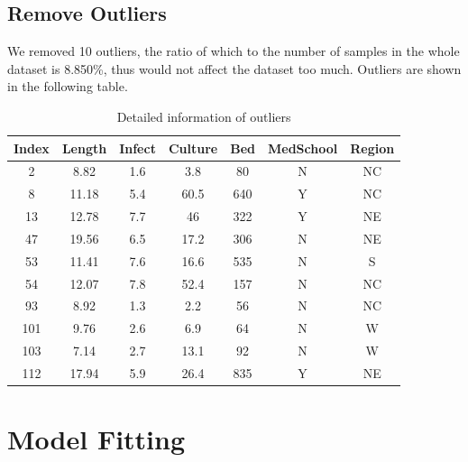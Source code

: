 \documentclass[a4paper,11pt,onecolumn,twoside]{article}
\begin{document}
\subsection{Remove Outliers}
We removed 10 outliers, the ratio of which to the number of samples in the whole dataset is 8.850\%, thus would not affect the dataset too much. Outliers are shown in the following table.
 \begin{table}[H]
	\centering
	\begin{tabular}{ccccccc}
		\midrule[1.5pt]
		Index & Length &Infect &Culture &Bed &MedSchool& Region\\
		\hline
	
        2    &8.82    &1.6     &3.8  &80         &N     &NC\\
		8  &11.18    &5.4    &60.5 &640         &Y     &NC\\
	    13  &12.78    &7.7      &46 &322         &Y    &NE\\
	    47   &19.56   & 6.5    &17.2 &306         &N     &NE\\
	    53  &11.41    &7.6    &16.6 &535         &N      &S\\
	    54  &12.07   & 7.8    &52.4 &157         &N     &NC\\
	    93   &8.92   & 1.3     &2.2  &56         &N     &NC\\
	 	101  & 9.76  &  2.6     &6.9  &64         &N      &W\\
	    103   &7.14  &  2.7    &13.1  &92        & N      &W\\
	    112  &17.94  &  5.9    &26.4 &835         &Y     &NE\\
		\midrule[1.5pt]
	\end{tabular}
	\caption{Detailed information of outliers }
\end{table}
\section{Model Fitting}
\end{document}
